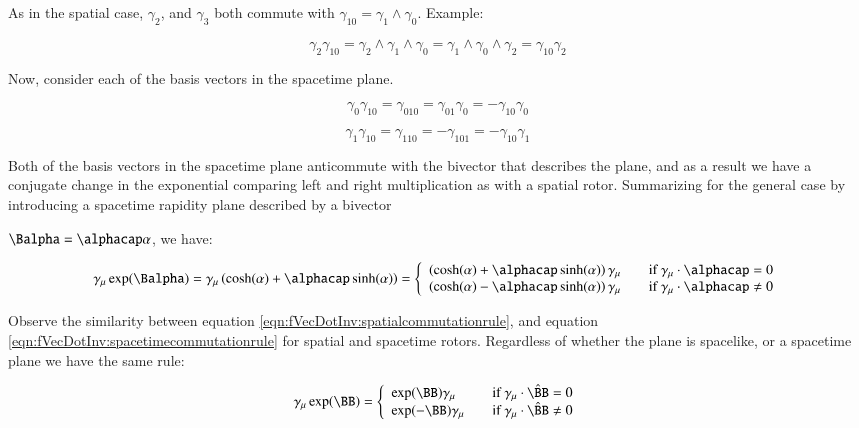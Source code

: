 As in the spatial case, $\gamma_{2}$, and $\gamma_{3}$ both commute with $\gamma_{10} = \gamma_1 \wedge \gamma_0$.  Example:

\begin{equation*}
\gamma_{2} \gamma_{10}
= \gamma_2 \wedge \gamma_1 \wedge \gamma_0
= \gamma_1 \wedge \gamma_0 \wedge \gamma_2
= \gamma_{10} \gamma_{2}
\end{equation*}

Now, consider each of the basis vectors in the spacetime plane.

\begin{equation*}
\gamma_{0} \gamma_{10}
= \gamma_{010}
= \gamma_{01} \gamma_{0}
= -\gamma_{10} \gamma_{0}
\end{equation*}

\begin{equation*}
\gamma_{1} \gamma_{10}
= \gamma_{110}
= -\gamma_{101}
= -\gamma_{10} \gamma_{1}
\end{equation*}

Both of the basis vectors in the spacetime plane anticommute with the bivector that describes the plane, and as a result we have a conjugate change in the exponential comparing left and right multiplication as with a spatial rotor.  Summarizing for the general case by introducing a spacetime rapidity plane described by a bivector

$\Balpha = \alphacap \alpha$, we have:

\begin{equation}\label{eqn:fVecDotInv:spacetimecommutationrule}
\gamma_{\mu}\exp(\Balpha)
= \gamma_{\mu}\left( \cosh(\alpha) + \alphacap\sinh(\alpha) \right)
=
\left\{ 
\begin{array}{l l}
\left( \cosh(\alpha) + \alphacap\sinh(\alpha) \right) \gamma_{\mu} & \quad \mbox{if $\gamma_{\mu} \cdot \alphacap = 0$} \\
\left( \cosh(\alpha) - \alphacap\sinh(\alpha) \right) \gamma_{\mu} & \quad \mbox{if $\gamma_{\mu} \cdot \alphacap \ne 0$} \\
\end{array} \right.
\end{equation}

Observe the similarity between equation \ref{eqn:fVecDotInv:spatialcommutationrule}, and equation \ref{eqn:fVecDotInv:spacetimecommutationrule} for spatial
and spacetime rotors.  Regardless of whether the plane is spacelike, or a spacetime plane we have the same rule:

\begin{equation}\label{eqn:fVecDotInv:generalrule}
\gamma_{\mu}\exp(\BB)
=
\left\{ 
\begin{array}{l l}
\exp(\BB) \gamma_{\mu} & \quad \mbox{if $\gamma_{\mu} \cdot \Bcap = 0$} \\
\exp(-\BB) \gamma_{\mu} & \quad \mbox{if $\gamma_{\mu} \cdot \Bcap \ne 0$}
\end{array} \right.
\end{equation}

